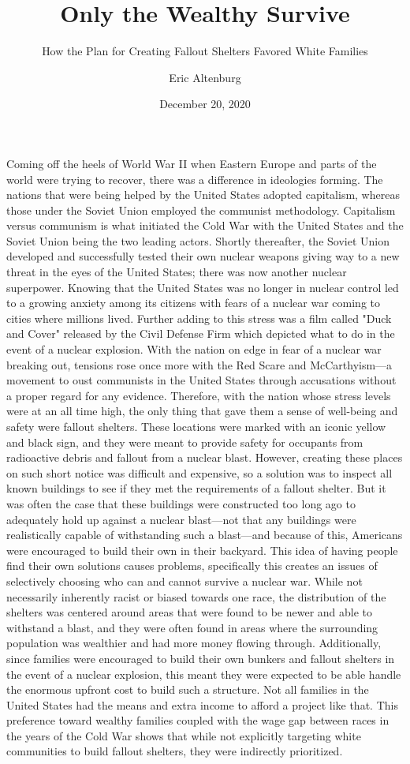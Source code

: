 \documentclass[12pt]{turabian-researchpaper}
\title{Only the Wealthy Survive}
\subtitle{How the Plan for Creating Fallout Shelters Favored White Families}
\author{Eric Altenburg}
\date{December 20, 2020}
\begin{document}
\maketitle

Coming off the heels of World War II when Eastern Europe and parts of the world were trying to recover, there was a difference in ideologies forming. The nations that were being helped by the United States adopted capitalism, whereas those under the Soviet Union employed the communist methodology. Capitalism versus communism is what initiated the Cold War with the United States and the Soviet Union being the two leading actors. Shortly thereafter, the Soviet Union developed and successfully tested their own nuclear weapons giving way to a new threat in the eyes of the United States; there was now another nuclear superpower. Knowing that the United States was no longer in nuclear control led to a growing anxiety among its citizens with fears of a nuclear war coming to cities where millions lived. Further adding to this stress was a film called "Duck and Cover" released by the Civil Defense Firm which depicted what to do in the event of a nuclear explosion. With the nation on edge in fear of a nuclear war breaking out, tensions rose once more with the Red Scare and McCarthyism—a movement to oust communists in the United States through accusations without a proper regard for any evidence. Therefore, with the nation whose stress levels were at an all time high, the only thing that gave them a sense of well-being and safety were fallout shelters. These locations were marked with an iconic yellow and black sign, and they were meant to provide safety for occupants from radioactive debris and fallout from a nuclear blast. However, creating these places on such short notice was difficult and expensive, so a solution was to inspect all known buildings to see if they met the requirements of a fallout shelter. But it was often the case that these buildings were constructed too long ago to adequately hold up against a nuclear blast—not that any buildings were realistically capable of withstanding such a blast—and because of this, Americans were encouraged to build their own in their backyard. This idea of having people find their own solutions causes problems, specifically this creates an issues of selectively choosing who can and cannot survive a nuclear war. While not necessarily inherently racist or biased towards one race, the distribution of the shelters was centered around areas that were found to be newer and able to withstand a blast, and they were often found in areas where the surrounding population was wealthier and had more money flowing through. Additionally, since families were encouraged to build their own bunkers and fallout shelters in the event of a nuclear explosion, this meant they were expected to be able handle the enormous upfront cost to build such a structure. Not all families in the United States had the means and extra income to afford a project like that. This preference toward wealthy families coupled with the wage gap between races in the years of the Cold War shows that while not explicitly targeting white communities to build fallout shelters, they were indirectly prioritized. 
\end{document}
